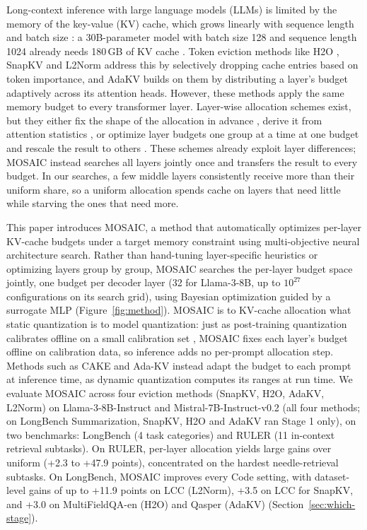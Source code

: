 \documentclass[11pt]{article}
\begin{document}
Long-context inference with large language models (LLMs) is limited by the memory of the key-value (KV) cache, which grows linearly with sequence length and batch size \citep{kwon2023pagedattention}: a 30B-parameter model with batch size 128 and sequence length 1024 already needs 180\,GB of KV cache \citep{zhang2023h2o}. Token eviction methods like H2O \citep{zhang2023h2o}, SnapKV \citep{li2024snapkv} and L2Norm \citep{devoto2024l2norm} address this by selectively dropping cache entries based on token importance, and AdaKV \citep{feng2025adakv} builds on them by distributing a layer's budget adaptively across its attention heads. However, these methods apply the same memory budget to every transformer layer. Layer-wise allocation schemes exist, but they either fix the shape of the allocation in advance \citep{cai2025pyramidkv}, derive it from attention statistics \citep{qin2025cake}, or optimize layer budgets one group at a time at one budget and rescale the result to others \citep{yu2025evolkv}. These schemes already exploit layer differences; MOSAIC instead searches all layers jointly once and transfers the result to every budget. In our searches, a few middle layers consistently receive more than their uniform share, so a uniform allocation spends cache on layers that need little while starving the ones that need more.

This paper introduces MOSAIC, a method that automatically optimizes per-layer KV-cache budgets under a target memory constraint using multi-objective neural architecture search. Rather than hand-tuning layer-specific heuristics or optimizing layers group by group, MOSAIC searches the per-layer budget space jointly, one budget per decoder layer (32 for Llama-3-8B, up to $10^{27}$ configurations on its search grid), using Bayesian optimization guided by a surrogate MLP (Figure~\ref{fig:method}). MOSAIC is to KV-cache allocation what static quantization is to model quantization: just as post-training quantization calibrates offline on a small calibration set \citep{frantar2023gptq,xiao2023smoothquant}, MOSAIC fixes each layer's budget offline on calibration data, so inference adds no per-prompt allocation step. Methods such as CAKE and Ada-KV instead adapt the budget to each prompt at inference time, as dynamic quantization computes its ranges at run time. We evaluate MOSAIC across four eviction methods (SnapKV, H2O, AdaKV, L2Norm) on Llama-3-8B-Instruct and Mistral-7B-Instruct-v0.2 (all four methods; on LongBench Summarization, SnapKV, H2O and AdaKV ran Stage 1 only), on two benchmarks: LongBench (4 task categories) and RULER (11 in-context retrieval subtasks). On RULER, per-layer allocation yields large gains over uniform (+2.3 to +47.9 points), concentrated on the hardest needle-retrieval subtasks. On LongBench, MOSAIC improves every Code setting, with dataset-level gains of up to +11.9 points on LCC (L2Norm), +3.5 on LCC for SnapKV, and +3.0 on MultiFieldQA-en (H2O) and Qasper (AdaKV) (Section~\ref{sec:which-stage}).
\end{document}
